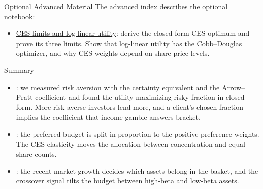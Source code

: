 \documentclass[aspectratio=169,11pt]{beamer}
\newcommand{\repo}{https://github.com/varnerlab/CHEME-5660-CourseRepository-Fall-2026/blob/main/lectures/week-7/L7b}
\begin{document}
\begin{frame}{Optional Advanced Material}
The \href{\repo/advanced/README.md}{advanced index} describes the optional notebook:
\begin{itemize}\setlength{\itemsep}{1em}
\item \href{\repo/advanced/adaptive_utility/CHEME-5660-L7b-Advanced-CES-Limits-Fall-2026.ipynb}{CES limits and log-linear utility}:
derive the closed-form CES optimum and prove its three limits. Show that
log-linear utility has the Cobb--Douglas optimizer, and why CES weights depend on
share price levels.
\end{itemize}
\end{frame}

\begin{frame}{Summary}
\begin{itemize}\setlength{\itemsep}{0.9em}
\item {}: we
measured risk aversion with the certainty equivalent and the Arrow--Pratt
coefficient and found the utility-maximizing risky fraction in closed form. More
risk-averse investors lend more, and a client's chosen fraction implies the
coefficient that income-gamble answers bracket.
\item {}: the
preferred budget is split in proportion to the positive preference weights. The
CES elasticity moves the allocation between concentration and equal share counts.
\item {}: the
recent market growth decides which assets belong in the basket, and the
crossover signal tilts the budget between high-beta and low-beta assets.
\end{itemize}
\end{frame}

\end{document}
